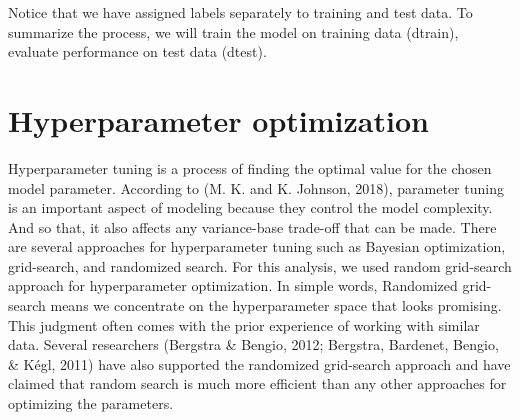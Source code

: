 \documentclass[11pt,oneside,a4paper]{reedthesis}
\begin{document}
Notice that we have assigned labels separately to training and test
data. To summarize the process, we will train the model on training data
(dtrain), evaluate performance on test data (dtest).

\section{Hyperparameter optimization}\label{hyperparameter-optimization}

Hyperparameter tuning is a process of finding the optimal value for the
chosen model parameter. According to (M. K. and K. Johnson, 2018),
parameter tuning is an important aspect of modeling because they control
the model complexity. And so that, it also affects any variance-base
trade-off that can be made. There are several approaches for
hyperparameter tuning such as Bayesian optimization, grid-search, and
randomized search. For this analysis, we used random grid-search
approach for hyperparameter optimization. In simple words, Randomized
grid-search means we concentrate on the hyperparameter space that looks
promising. This judgment often comes with the prior experience of
working with similar data. Several researchers (Bergstra \& Bengio,
2012; Bergstra, Bardenet, Bengio, \& Kégl, 2011) have also supported the
randomized grid-search approach and have claimed that random search is
much more efficient than any other approaches for optimizing the
parameters.
\end{document}
